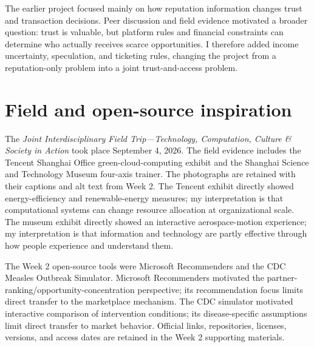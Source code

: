 The earlier project focused mainly on how reputation information changes trust and transaction decisions. Peer discussion and field evidence motivated a broader question: trust is valuable, but platform rules and financial constraints can determine who actually receives scarce opportunities. I therefore added income uncertainty, speculation, and ticketing rules, changing the project from a reputation-only problem into a joint trust-and-access problem.

\section{Field and open-source inspiration}
The \emph{Joint Interdisciplinary Field Trip---Technology, Computation, Culture \& Society in Action} took place September 4, 2026. The field evidence includes the Tencent Shanghai Office green-cloud-computing exhibit and the Shanghai Science and Technology Museum four-axis trainer. The photographs are retained with their captions and alt text from Week 2. The Tencent exhibit directly showed energy-efficiency and renewable-energy measures; my interpretation is that computational systems can change resource allocation at organizational scale. The museum exhibit directly showed an interactive aerospace-motion experience; my interpretation is that information and technology are partly effective through how people experience and understand them.

The Week 2 open-source tools were Microsoft Recommenders and the CDC Measles Outbreak Simulator. Microsoft Recommenders motivated the partner-ranking/opportunity-concentration perspective; its recommendation focus limits direct transfer to the marketplace mechanism. The CDC simulator motivated interactive comparison of intervention conditions; its disease-specific assumptions limit direct transfer to market behavior. Official links, repositories, licenses, versions, and access dates are retained in the Week 2 supporting materials.

